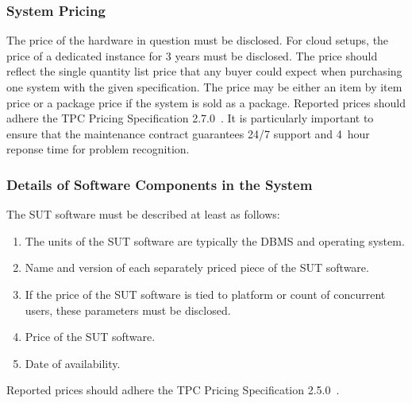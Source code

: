 \subsubsection{System Pricing}
The price of the hardware in question must be disclosed. For cloud setups, the price of a dedicated instance for 3 years must be disclosed. The price should reflect the single quantity list price that any buyer could expect when purchasing one system with the given specification. The price may be either an item by item price or a package price if the system is sold as a package.
Reported prices should adhere the TPC Pricing Specification 2.7.0~\cite{pricing,tpc-pricing}.
It is particularly important to ensure that the maintenance contract guarantees 24/7 support and 4~hour reponse time for problem recognition.

\subsubsection{Details of Software Components in the System}
The SUT software must be described at least as follows:
\begin{enumerate}
    \item The units of the SUT software are typically the DBMS and operating system.
    \item Name and version of each separately priced piece of the SUT software.
    \item If the price of the SUT software is tied to platform or count of concurrent users, these parameters must be disclosed.
    \item Price of the SUT software.
    \item Date of availability.
\end{enumerate}
Reported prices should adhere the TPC Pricing Specification 2.5.0~\cite{pricing,tpc-pricing}.

